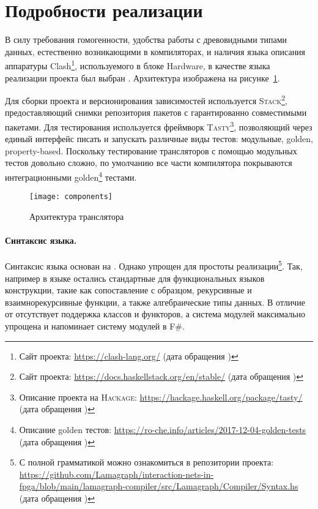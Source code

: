 
\section{Подробности реализации}

В силу требования гомогенности, удобства работы с древовидными типами данных, естественно возникающими в компиляторах, и наличия языка описания аппаратуры Clash\footnote{Сайт проекта: \url{https://clash-lang.org/} (дата обращения )}, используемого в блоке Hardware, в качестве языка реализации проекта был выбран \Haskell{}.
Архитектура изображена на рисунке~\ref{fig:lmlcmods}.

Для сборки проекта и версионирования зависимостей используется \textsc{Stack}\footnote{Сайт проекта: \url{https://docs.haskellstack.org/en/stable/} (дата обращения )}, предоставляющий снимки репозитория пакетов с гарантированно совместимыми пакетами.
Для тестирования используется фреймворк \textsc{Tasty}\footnote{Описание проекта на \textsc{Hackage}: \url{https://hackage.haskell.org/package/tasty/} (дата обращения )}, позволяющий через единый интерфейс писать и запускать различные виды тестов: модульные, golden, property-based.
Поскольку тестирование трансляторов с помощью модульных тестов довольно сложно, по умолчанию все части компилятора покрываются интеграционными golden\footnote{Описание golden тестов: \url{https://ro-che.info/articles/2017-12-04-golden-tests} (дата обращения )} тестами.

\begin{figure}[h]
    \begin{center}
        \texttt{[image: components]}
    \end{center}
    \caption{Архитектура транслятора}
    \label{fig:lmlcmods}
\end{figure}

\paragraph{Синтаксис языка.}

Синтаксис языка основан на \OCaml{}.
Однако упрощен для простоты реализации\footnote{С полной грамматикой можно ознакомиться в репозитории проекта: \url{https://github.com/Lamagraph/interaction-nets-in-fpga/blob/main/lamagraph-compiler/src/Lamagraph/Compiler/Syntax.hs} (дата обращения )}.
Так, например в языке остались стандартные для функциональных языков конструкции, такие как сопоставление с образцом, рекурсивные и взаимнорекурсивные функции, а также алгебраические типы данных.
В отличие от \OCaml{} отсутствует поддержка классов и функторов, а система модулей максимально упрощена и напоминает систему модулей в F\#.


